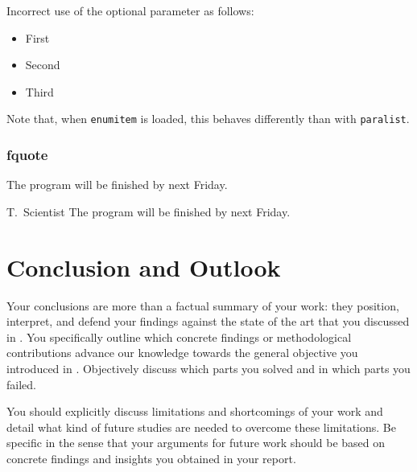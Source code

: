 Incorrect use of the optional parameter as follows:
\begin{itemize}
  \item[first] First
  \item[second] Second
  \item[third] Third
\end{itemize}
Note that, when \texttt{enumitem} is loaded, this behaves differently than with \texttt{paralist}.

\subsection{fquote}

\begin{fquote}[T.\ Scientist]
  The program will be finished by next Friday.
\end{fquote}

\begin{gfquote}{T.\ Scientist}
  The program will be finished by next Friday.
\end{gfquote}


\chapter{Conclusion and Outlook}\label{sec:conclusion}

Your conclusions are more than a factual summary of your work: they position, interpret, and defend your findings against the state of the art that you discussed in .
You specifically outline which concrete findings or methodological contributions advance our knowledge towards the general objective you introduced in .
Objectively discuss which parts you solved and in which parts you failed.

You should explicitly discuss limitations and shortcomings of your work and detail what kind of future studies are needed to overcome these limitations.
Be specific in the sense that your arguments for future work should be based on concrete findings and insights you obtained in your report.



